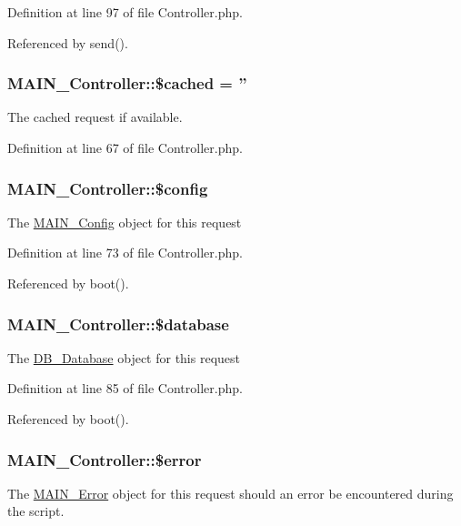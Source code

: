 Definition at line 97 of file Controller.php.

Referenced by send().\hypertarget{classMAIN__Controller_acc4c62c1bdc82257bfab216245c3ba98}{
\subsubsection[{\$cached}]{\setlength{\rightskip}{0pt plus 5cm}MAIN\_\-Controller::\$cached = ''}}
\label{d0/d6f/classMAIN__Controller_acc4c62c1bdc82257bfab216245c3ba98}
The cached request if available. 

Definition at line 67 of file Controller.php.\hypertarget{classMAIN__Controller_a2aca1668ade4cd033ab1376fe5ce3641}{
\subsubsection[{\$config}]{\setlength{\rightskip}{0pt plus 5cm}MAIN\_\-Controller::\$config}}
\label{d0/d6f/classMAIN__Controller_a2aca1668ade4cd033ab1376fe5ce3641}
The \hyperlink{classMAIN__Config}{MAIN\_\-Config} object for this request 

Definition at line 73 of file Controller.php.

Referenced by boot().\hypertarget{classMAIN__Controller_ace18fc24f51944c19682bffe09603f97}{
\subsubsection[{\$database}]{\setlength{\rightskip}{0pt plus 5cm}MAIN\_\-Controller::\$database}}
\label{d0/d6f/classMAIN__Controller_ace18fc24f51944c19682bffe09603f97}
The \hyperlink{classDB__Database}{DB\_\-Database} object for this request 

Definition at line 85 of file Controller.php.

Referenced by boot().\hypertarget{classMAIN__Controller_afc211a153cde6633f13d1797ceab6adb}{
\subsubsection[{\$error}]{\setlength{\rightskip}{0pt plus 5cm}MAIN\_\-Controller::\$error}}
\label{d0/d6f/classMAIN__Controller_afc211a153cde6633f13d1797ceab6adb}
The \hyperlink{classMAIN__Error}{MAIN\_\-Error} object for this request should an error be encountered during the script. 

